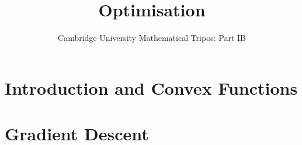\documentclass{article}
\title{Optimisation}
\author{Cambridge University Mathematical Tripos: Part IB}
\begin{document}
\maketitle

\tableofcontentsnewpage{}

\section{Introduction and Convex Functions}

\section{Gradient Descent}

\end{document}
